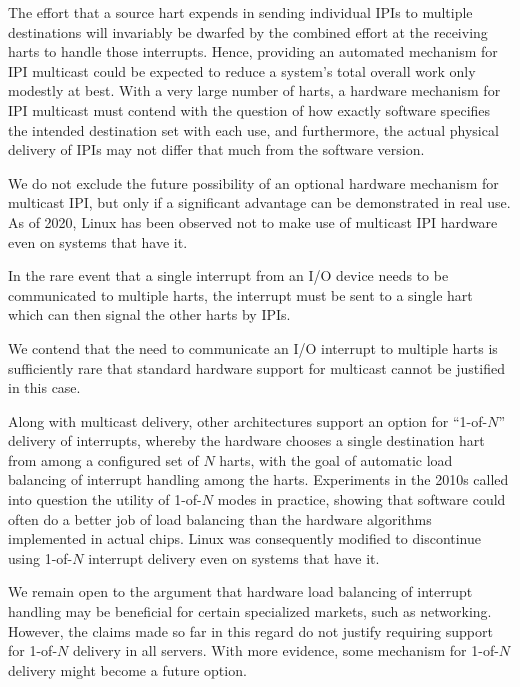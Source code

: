 \begin{commentary}
The effort that a source hart expends in sending individual IPIs to
multiple destinations will invariably be dwarfed by the combined effort
at the receiving harts to handle those interrupts.
Hence, providing an automated mechanism for IPI multicast could be
expected to reduce a system's total overall work only modestly at best.
With a very large number of harts, a hardware mechanism for IPI
multicast must contend with the question of how exactly software
specifies the intended destination set with each use, and furthermore,
the actual physical delivery of IPIs may not differ that much from the
software version.

We do not exclude the future possibility of an optional hardware
mechanism for multicast IPI, but only if a significant advantage can be
demonstrated in real use.
As of 2020, Linux has been observed not to make use of multicast IPI
hardware even on systems that have it.
\end{commentary}

In the rare event that a single interrupt from an I/O device needs
to be communicated to multiple harts, the interrupt must be sent to a
single hart which can then signal the other harts by IPIs.

\begin{commentary}
We contend that the need to communicate an I/O interrupt to multiple
harts is sufficiently rare that standard hardware support for multicast
cannot be justified in this case.
\end{commentary}

\begin{commentary}
Along with multicast delivery, other architectures support an option
for ``\mbox{1-of-$N$}'' delivery of interrupts, whereby the hardware
chooses a single destination hart from among a configured set of
$N$ harts, with the goal of automatic load balancing of interrupt
handling among the harts.
Experiments in the 2010s called into question the utility of
\mbox{1-of-$N$} modes in practice, showing that software could often do
a better job of load balancing than the hardware algorithms implemented
in actual chips.
Linux was consequently modified to discontinue using \mbox{1-of-$N$}
interrupt delivery even on systems that have it.

We remain open to the argument that hardware load balancing of
interrupt handling may be beneficial for certain specialized markets,
such as networking.
However, the claims made so far in this regard do not justify requiring
support for \mbox{1-of-$N$} delivery in all {\RISCV} servers.
With more evidence, some mechanism for \mbox{1-of-$N$} delivery might
become a future option.
\end{commentary}

